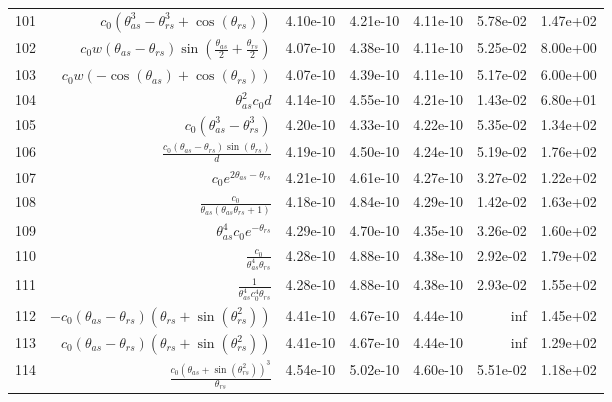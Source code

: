 \begin{tabularx}{\textwidth}{lRRRRRl}
101  &  $ c_{0} \left(\theta_{as}^{3} - \theta_{rs}^{3} + \cos{\left(\theta_{rs} \right)}\right) $  &  4.10e-10  &  4.21e-10  &  4.11e-10  &  5.78e-02  &  1.47e+02  \\ 
102  &  $ c_{0} w \left(\theta_{as} - \theta_{rs}\right) \sin{\left(\displaystyle\frac{\theta_{as}}{2} + \displaystyle\frac{\theta_{rs}}{2} \right)} $  &  4.07e-10  &  4.38e-10  &  4.11e-10  &  5.25e-02  &  8.00e+00  \\ 
103  &  $ c_{0} w \left(- \cos{\left(\theta_{as} \right)} + \cos{\left(\theta_{rs} \right)}\right) $  &  4.07e-10  &  4.39e-10  &  4.11e-10  &  5.17e-02  &  6.00e+00  \\ 
104  &  $ \theta_{as}^{2} c_{0} d $  &  4.14e-10  &  4.55e-10  &  4.21e-10  &  1.43e-02  &  6.80e+01  \\ 
105  &  $ c_{0} \left(\theta_{as}^{3} - \theta_{rs}^{3}\right) $  &  4.20e-10  &  4.33e-10  &  4.22e-10  &  5.35e-02  &  1.34e+02  \\ 
106  &  $ \displaystyle\frac{c_{0} \left(\theta_{as} - \theta_{rs}\right) \sin{\left(\theta_{rs} \right)}}{d} $  &  4.19e-10  &  4.50e-10  &  4.24e-10  &  5.19e-02  &  1.76e+02  \\ 
107  &  $ c_{0} e^{2 \theta_{as} - \theta_{rs}} $  &  4.21e-10  &  4.61e-10  &  4.27e-10  &  3.27e-02  &  1.22e+02  \\ 
108  &  $ \displaystyle\frac{c_{0}}{\theta_{as} \left(\theta_{as} \theta_{rs} + 1\right)} $  &  4.18e-10  &  4.84e-10  &  4.29e-10  &  1.42e-02  &  1.63e+02  \\ 
109  &  $ \theta_{as}^{4} c_{0} e^{- \theta_{rs}} $  &  4.29e-10  &  4.70e-10  &  4.35e-10  &  3.26e-02  &  1.60e+02  \\ 
110  &  $ \displaystyle\frac{c_{0}}{\theta_{as}^{4} \theta_{rs}} $  &  4.28e-10  &  4.88e-10  &  4.38e-10  &  2.92e-02  &  1.79e+02  \\ 
111  &  $ \displaystyle\frac{1}{\theta_{as}^{4} c_{0}^{4} \theta_{rs}} $  &  4.28e-10  &  4.88e-10  &  4.38e-10  &  2.93e-02  &  1.55e+02  \\ 
112  &  $ - c_{0} \left(\theta_{as} - \theta_{rs}\right) \left(\theta_{rs} + \sin{\left(\theta_{rs}^{2} \right)}\right) $  &  4.41e-10  &  4.67e-10  &  4.44e-10  &  inf  &  1.45e+02  \\ 
113  &  $ c_{0} \left(\theta_{as} - \theta_{rs}\right) \left(\theta_{rs} + \sin{\left(\theta_{rs}^{2} \right)}\right) $  &  4.41e-10  &  4.67e-10  &  4.44e-10  &  inf  &  1.29e+02  \\ 
114  &  $ \displaystyle\frac{c_{0} \left(\theta_{as} + \sin{\left(\theta_{rs}^{2} \right)}\right)^{3}}{\theta_{rs}} $  &  4.54e-10  &  5.02e-10  &  4.60e-10  &  5.51e-02  &  1.18e+02  \\ 

\end{tabularx}
